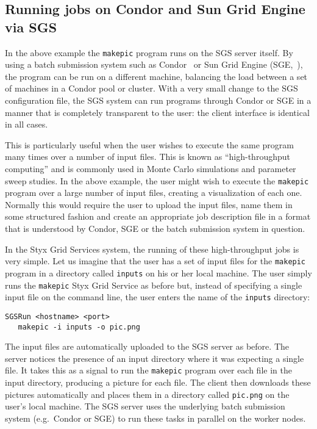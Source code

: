 \documentclass[a4paper]{article}
\begin{document}
\begin{multicols}{2}
\subsection{Running jobs on Condor and Sun Grid Engine via SGS}\label{sec:condor_sge}
In the above example the {\tt makepic} program runs on the SGS server itself.  By using a batch submission system such as Condor~\cite{condor} or Sun Grid Engine (SGE,~\cite{sungridengine}), the program can be run on a different machine, balancing the load between a set of machines in a Condor pool or cluster.  With a very small change to the SGS configuration file, the SGS system can run programs through Condor or SGE in a manner that is completely transparent to the user: the client interface is identical in all cases.

This is particularly useful when the user wishes to execute the same program many times over a number of input files.  This is known as ``high-throughput computing'' and is commonly used in Monte Carlo simulations and parameter sweep studies.  In the above example, the user might wish to execute the {\tt makepic} program over a large number of input files, creating a visualization of each one.  Normally this would require the user to upload the input files, name them in some structured fashion and create an appropriate job description file in a format that is understood by Condor, SGE or the batch submission system in question.

In the Styx Grid Services system, the running of these high-throughput jobs is very simple.  Let us imagine that the user has a set of input files for the {\tt makepic} program in a directory called {\tt inputs} on his or her local machine.  The user simply runs the {\tt makepic} Styx Grid Service as before but, instead of specifying a single input file on the command line, the user enters the name of the {\tt inputs} directory:

\begin{verbatim}
SGSRun <hostname> <port>
   makepic -i inputs -o pic.png
\end{verbatim}

The input files are automatically uploaded to the SGS server as before.  The server notices the presence of an input directory where it was expecting a single file.  It takes this as a signal to run the {\tt makepic} program over each file in the input directory, producing a picture for each file.  The client then downloads these pictures automatically and places them in a directory called {\tt pic.png} on the user's local machine.  The SGS server uses the underlying batch submission system (e.g.\ Condor or SGE) to run these tasks in parallel on the worker nodes.


\end{multicols}
\end{document}
